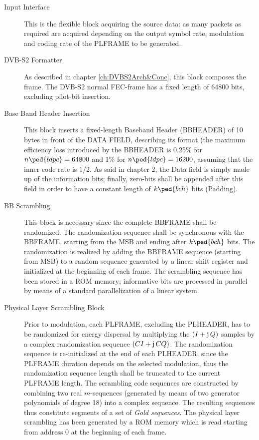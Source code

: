 \begin{description}
\item[Input Interface] This is the flexible block acquiring the source data: as many packets as required are acquired  depending on the output symbol rate, modulation and coding rate of the PLFRAME to be generated.

\item[DVB-S2 Formatter] As described in chapter \ref{ch:DVBS2Arch&Conc}, this block composes the frame. The DVB-S2 normal FEC-frame has a fixed length of 64800 bits, excluding pilot-bit insertion.

\item[Base Band Header Insertion] This block inserts a fixed-length Baseband Header (BBHEADER) of 10 bytes in front of the DATA FIELD, describing its format (the maximum efficiency loss introduced by the BBHEADER is 0.25\% for \(n\ped{ldpc}=64800\) and 1\% for \(n\ped{ldpc}=16200\), assuming that the inner code rate is \(1/2\). As said in chapter 2, the Data field is simply made up of the information bits; finally, zero-bits shall be appended after this field in order to have a constant length of \(k\ped{bch}\) bits (Padding).

\item[BB Scrambling] This block is necessary since the complete BBFRAME shall be randomized. The randomization sequence shall be synchronous with the BB\-FRAME, starting from the MSB and ending after \(k\ped{bch}\) bits. The randomization is realized by adding the BBFRAME sequence (starting from MSB) to a random sequence generated by a linear shift register and initialized at the beginning of each frame. The scrambling sequence has been stored in a ROM memory; informative bits are processed in parallel by means of a standard parallelization of a linear system.

\item[Physical Layer Scrambling Block] Prior to modulation, each PLFRAME, excluding the PLHEADER, has to be randomized for energy dispersal by multiplying the \((I+ \operatorname{\mathrm{j\mathstrut}} Q)\) samples by a complex randomization sequence \((CI+ \operatorname{\mathrm{j\mathstrut}} CQ)\). The randomization sequence is re-initialized at the end of each PLHEADER, since the PLFRAME duration depends on the selected modulation, thus the randomization sequence length shall be truncated to the current PLFRAME length. The scrambling code sequences are constructed by combining two real \(m\)-sequences (generated by means of two generator polynomials of degree 18) into a complex sequence. The resulting sequences thus constitute segments of a set of \emph{Gold sequences}. The physical layer scrambling has been generated by a ROM memory which is read starting from address 0 at the beginning of each frame.


\end{description}
